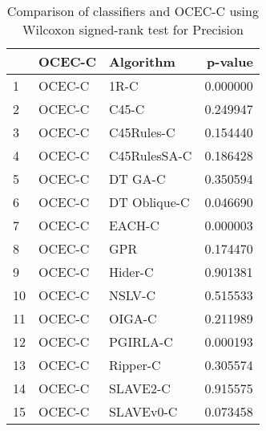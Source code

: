 \begin{table}
\footnotesize
\caption{Comparison of classifiers and OCEC-C using Wilcoxon signed-rank test for Precision}
\label{tab:OCEC-C wilcoxon Precision comparison}
\begin{tabular}{lllr}
\hline
 & OCEC-C & Algorithm & p-value \\
\hline
1 & OCEC-C & 1R-C & 0.000000 \\
2 & OCEC-C & C45-C & 0.249947 \\
3 & OCEC-C & C45Rules-C & 0.154440 \\
4 & OCEC-C & C45RulesSA-C & 0.186428 \\
5 & OCEC-C & DT GA-C & 0.350594 \\
6 & OCEC-C & DT Oblique-C & 0.046690 \\
7 & OCEC-C & EACH-C & 0.000003 \\
8 & OCEC-C & GPR & 0.174470 \\
9 & OCEC-C & Hider-C & 0.901381 \\
10 & OCEC-C & NSLV-C & 0.515533 \\
11 & OCEC-C & OIGA-C & 0.211989 \\
12 & OCEC-C & PGIRLA-C & 0.000193 \\
13 & OCEC-C & Ripper-C & 0.305574 \\
14 & OCEC-C & SLAVE2-C & 0.915575 \\
15 & OCEC-C & SLAVEv0-C & 0.073458 \\
\hline
\end{tabular}
\end{table}
